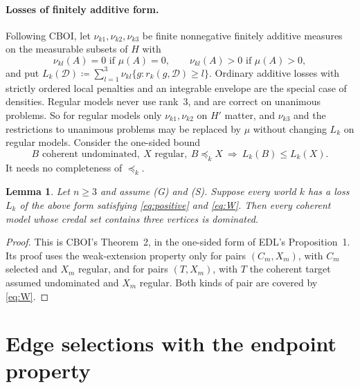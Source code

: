\documentclass[11pt]{article}
\newtheorem{lemma}[theorem]{Lemma}
\theoremstyle{definition}\newtheorem{definition}[theorem]{Definition}
\theoremstyle{remark}\newtheorem{remark}[theorem]{Remark}
\newcommand{\Dscr}{\mathcal D}
\begin{document}
\paragraph{Losses of finitely additive form.} Following CBOI, let
$\nu_{k1},\nu_{k2},\nu_{k3}$ be finite nonnegative finitely additive
measures on the measurable subsets of $H$ with
\begin{equation}
 \nu_{kl}(A)=0\text{ if }\mu(A)=0,\qquad\nu_{kl}(A)>0\text{ if }\mu(A)>0,
 \label{eq:positive}
\end{equation}
and put $L_k(\Dscr)\coloneqq\sum_{l=1}^3\nu_{kl}\{g:r_k(g,\Dscr)\ge l\}$.
Ordinary additive losses with strictly ordered local penalties and an
integrable envelope are the special case of densities. Regular models never
use rank~$3$, and are correct on unanimous problems. So for regular models
only $\nu_{k1},\nu_{k2}$ on $H'$ matter, and $\nu_{k3}$ and the restrictions
to unanimous problems may be replaced by $\mu$ without changing $L_k$ on
regular models. Consider the one-sided bound
\begin{equation}
 B\text{ coherent undominated},\ X\text{ regular},\ B\preceq_kX
 \ \Longrightarrow\ L_k(B)\le L_k(X).
 \tag{W$_k$}\label{eq:W}
\end{equation}
It needs no completeness of $\preceq_k$.

\begin{lemma}\label{lem:cboi}
Let $n\ge3$ and assume (G) and (S). Suppose every world $k$ has a loss $L_k$
of the above form satisfying \eqref{eq:positive} and \eqref{eq:W}. Then every
coherent model whose credal set contains three vertices is dominated.
\end{lemma}
\begin{proof}
This is CBOI's Theorem~2, in the one-sided form of EDL's Proposition~1. Its
proof uses the weak-extension property only for
pairs $(C_m,X_m)$, with $C_m$ selected and $X_m$ regular, and for pairs
$(T,X_m)$, with $T$ the coherent target assumed undominated and $X_m$
regular. Both kinds of pair are covered by \eqref{eq:W}.
\end{proof}

\section{Edge selections with the endpoint property}\label{sec:edges}
\end{document}
